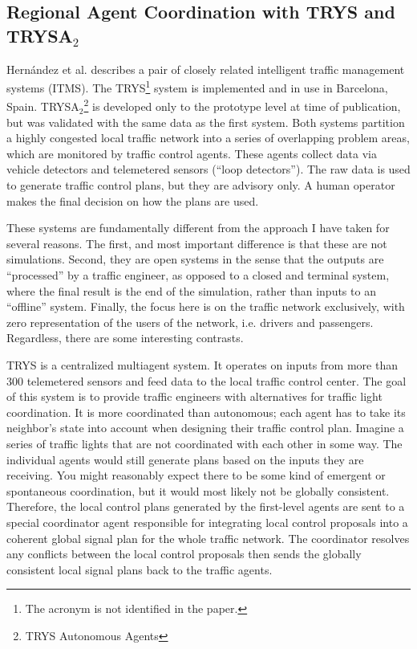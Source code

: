 \documentclass[11pt,letterpaper,onecolumn,twoside,openright,draft]{report}
\begin{document}
\subsection{Regional Agent Coordination with TRYS and TRYSA$_{2}$}
Hern\'{a}ndez et al.\cite{hernandez2001} describes a pair of closely related intelligent traffic management systems (ITMS).
The TRYS\footnote{The acronym is not identified in the paper.} system is implemented and in use in Barcelona, Spain.
TRYSA$_{2}$\footnote{TRYS Autonomous Agents} is developed only to the prototype level at time of publication, but was validated with the same data as the first system.
Both systems partition a highly congested local traffic network into a series of overlapping problem areas, which are monitored by traffic control agents.
These agents collect data via vehicle detectors and telemetered sensors (``loop detectors'').
The raw data is used to generate traffic control plans, but they are advisory only.
A human operator makes the final decision on how the plans are used.

These systems are fundamentally different from the approach I have taken for several reasons.
The first, and most important difference is that these are not simulations.
Second, they are open systems in the sense that the outputs are ``processed'' by a traffic engineer, as opposed to a closed and terminal system, where the final result is the end of the simulation, rather than inputs to an ``offline'' system.
Finally, the focus here is on the traffic network exclusively, with zero representation of the users of the network, i.e. drivers and passengers.
Regardless, there are some interesting contrasts.

TRYS is a centralized multiagent system.
It operates on inputs from more than 300 telemetered sensors and feed data to the local traffic control center.
The goal of this system is to provide traffic engineers with alternatives for traffic light coordination.
It is more coordinated than autonomous; each agent has to take its neighbor's state into account when designing their traffic control plan.
Imagine a series of traffic lights that are not coordinated with each other in some way.
The individual agents would still generate plans based on the inputs they are receiving.
You might reasonably expect there to be some kind of emergent or spontaneous coordination, but it would most likely not be globally consistent.
Therefore, the local control plans generated by the first-level agents are sent to a special coordinator agent responsible for integrating local control proposals into a coherent global signal plan for the whole traffic network.
The coordinator resolves any conflicts between the local control proposals then sends the globally consistent local signal plans back to the traffic agents.
\end{document}
